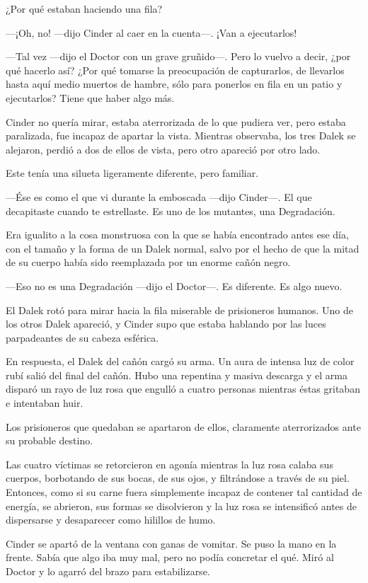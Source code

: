 ¿Por qué estaban haciendo una fila?

—¡Oh, no! —dijo Cinder al caer en la cuenta—. ¡Van a ejecutarlos!

—Tal vez —dijo el Doctor con un grave gruñido—. Pero lo vuelvo a decir, ¿por qué hacerlo así? ¿Por qué tomarse la preocupación de capturarlos, de llevarlos hasta aquí medio muertos de hambre, sólo para ponerlos en fila en un patio y ejecutarlos? Tiene que haber algo más.

Cinder no quería mirar, estaba aterrorizada de lo que pudiera ver, pero estaba paralizada, fue incapaz de apartar la vista. Mientras observaba, los tres Dalek se alejaron, perdió a dos de ellos de vista, pero otro apareció por otro lado.

Este tenía una silueta ligeramente diferente, pero familiar.

—Ése es como el que vi durante la emboscada —dijo Cinder—. El que decapitaste cuando te estrellaste. Es uno de los mutantes, una Degradación.

Era igualito a la cosa monstruosa con la que se había encontrado antes ese día, con el tamaño y la forma de un Dalek normal, salvo por el hecho de que la mitad de su cuerpo había sido reemplazada por un enorme cañón negro.

—Eso no es una Degradación —dijo el Doctor—. Es diferente. Es algo nuevo.

El Dalek rotó para mirar hacia la fila miserable de prisioneros humanos. Uno de los otros Dalek apareció, y Cinder supo que estaba hablando por las luces parpadeantes de su cabeza esférica.

En respuesta, el Dalek del cañón cargó su arma. Un aura de intensa luz de color rubí salió del final del cañón. Hubo una repentina y masiva descarga y el arma disparó un rayo de luz rosa que engulló a cuatro personas mientras éstas gritaban e intentaban huir.

Los prisioneros que quedaban se apartaron de ellos, claramente aterrorizados ante su probable destino.

Las cuatro víctimas se retorcieron en agonía mientras la luz rosa calaba sus cuerpos, borbotando de sus bocas, de sus ojos, y filtrándose a través de su piel. Entonces, como si su carne fuera simplemente incapaz de contener tal cantidad de energía, se abrieron, sus formas se disolvieron y la luz rosa se intensificó antes de dispersarse y desaparecer como hilillos de humo.

Cinder se apartó de la ventana con ganas de vomitar. Se puso la mano en la frente. Sabía que algo iba muy mal, pero no podía concretar el qué. Miró al Doctor y lo agarró del brazo para estabilizarse.



